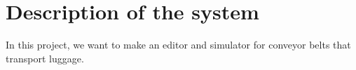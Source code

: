 \section{Description of the system}
In this project, we want to make an editor and simulator for conveyor belts that transport luggage.